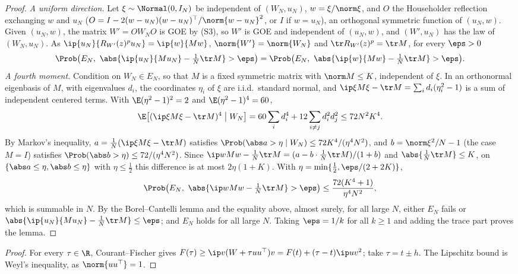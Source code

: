 \begin{refsection}
\begin{proof}
\emph{A uniform direction.} Let $\xi\sim\Normal(0,I_N)$ be independent of $(W_N,u_N)$, $w=\xi/\norm\xi$, and $O$ the Householder reflection exchanging $w$ and $u_N$ ($O=I-2(w-u_N)(w-u_N)^\top/\norm{w-u_N}^2$, or $I$ if $w=u_N$), an orthogonal symmetric function of $(u_N,w)$. Given $(u_N,w)$, the matrix $W'=OW_NO$ is GOE by (S3), so $W'$ is GOE and independent of $(u_N,w)$, and $(W',u_N)$ has the law of $(W_N,u_N)$. As $\ip{u_N}{R_{W'}(z)^pu_N}=\ip{w}{Mw}$, $\norm{W'}=\norm{W_N}$ and $\tr R_{W'}(z)^p=\tr M$, for every $\eps>0$
\[
\Prob\bigl(E_N,\ \abs{\ip{u_N}{Mu_N}-\tfrac1N\tr M}>\eps\bigr)=\Prob\bigl(E_N,\ \abs{\ip{w}{Mw}-\tfrac1N\tr M}>\eps\bigr).
\]
\emph{A fourth moment.} Condition on $W_N\in E_N$, so that $M$ is a fixed symmetric matrix with $\norm M\le K$, independent of $\xi$. In an orthonormal eigenbasis of $M$, with eigenvalues $d_i$, the coordinates $\eta_i$ of $\xi$ are i.i.d.\ standard normal, and $\ip\xi{M\xi}-\tr M=\sum_id_i(\eta_i^2-1)$ is a sum of independent centered terms. With $\E(\eta^2-1)^2=2$ and $\E(\eta^2-1)^4=60$,
\[
\E\bigl[(\ip\xi{M\xi}-\tr M)^4\bigm|W_N\bigr]=60\sum_id_i^4+12\sum_{i\ne j}d_i^2d_j^2\le72N^2K^4.
\]
By Markov's inequality, $a=\frac1N(\ip\xi{M\xi}-\tr M)$ satisfies $\Prob(\abs a>\eta\mid W_N)\le72K^4/(\eta^4N^2)$, and $b=\norm\xi^2/N-1$ (the case $M=I$) satisfies $\Prob(\abs b>\eta)\le72/(\eta^4N^2)$. Since $\ip w{Mw}-\frac1N\tr M=(a-b\cdot\frac1N\tr M)/(1+b)$ and $\abs{\frac1N\tr M}\le K$, on $\{\abs a\le\eta,\abs b\le\eta\}$ with $\eta\le\frac12$ this difference is at most $2\eta(1+K)$. With $\eta=\min\{\frac12,\eps/(2+2K)\}$,
\[
\Prob\bigl(E_N,\ \abs{\ip w{Mw}-\tfrac1N\tr M}>\eps\bigr)\le\frac{72(K^4+1)}{\eta^4N^2},
\]
which is summable in $N$. By the Borel--Cantelli lemma and the equality above, almost surely, for all large $N$, either $E_N$ fails or $\abs{\ip{u_N}{Mu_N}-\frac1N\tr M}\le\eps$; and $E_N$ holds for all large $N$. Taking $\eps=1/k$ for all $k\ge1$ and adding the trace part proves the lemma.
\end{proof}


\begin{proof}
For every $\tau\in\R$, Courant--Fischer gives $F(\tau)\ge\ip v{(W+\tau uu^\top)v}=F(t)+(\tau-t)\ip uv^2$; take $\tau=t\pm h$. The Lipschitz bound is Weyl's inequality, as $\norm{uu^\top}=1$.
\end{proof}


\end{refsection}
